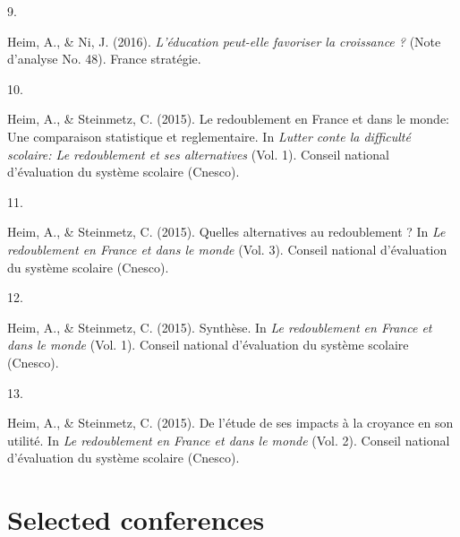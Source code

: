 \documentclass[11pt,a4paper,]{awesome-cv}
\newlength{\cslhangindent}
\newlength{\csllabelwidth}
\newenvironment{CSLReferences}[2] %
 {\begin{list}{}{%
  \setlength{\itemindent}{0pt}
  \setlength{\leftmargin}{0pt}
  \setlength{\parsep}{0pt}
  \ifodd #1
   \setlength{\leftmargin}{\cslhangindent}
   \setlength{\itemindent}{-1\cslhangindent}
  \fi
  \setlength{\itemsep}{#2\baselineskip}}}
 {\end{list}}
\newcommand{\CSLLeftMargin}[1]{\parbox[t]{\csllabelwidth}{\strut#1\strut}}
\newcommand{\CSLRightInline}[1]{\parbox[t]{\linewidth - \csllabelwidth}{\strut#1\strut}}
\begin{document}
\begin{CSLReferences}{0}{0}
\CSLLeftMargin{9. }%
\CSLRightInline{Heim, A., \& Ni, J. (2016). \emph{L'éducation peut-elle
favoriser la croissance ?} (Note d'analyse No. 48). France stratégie.}

\CSLLeftMargin{10. }%
\CSLRightInline{Heim, A., \& Steinmetz, C. (2015). Le redoublement en
France et dans le monde: Une comparaison statistique et reglementaire.
In \emph{Lutter conte la difficulté scolaire: Le redoublement et ses
alternatives} (Vol. 1). Conseil national d'évaluation du système
scolaire (Cnesco).}

\CSLLeftMargin{11. }%
\CSLRightInline{Heim, A., \& Steinmetz, C. (2015). Quelles alternatives
au redoublement ? In \emph{Le redoublement en France et dans le monde}
(Vol. 3). Conseil national d'évaluation du système scolaire (Cnesco).}

\CSLLeftMargin{12. }%
\CSLRightInline{Heim, A., \& Steinmetz, C. (2015). Synthèse. In \emph{Le
redoublement en France et dans le monde} (Vol. 1). Conseil national
d'évaluation du système scolaire (Cnesco).}

\CSLLeftMargin{13. }%
\CSLRightInline{Heim, A., \& Steinmetz, C. (2015). De l'étude de ses
impacts à la croyance en son utilité. In \emph{Le redoublement en France
et dans le monde} (Vol. 2). Conseil national d'évaluation du système
scolaire (Cnesco).}

\end{CSLReferences}

\section{Selected conferences}\label{selected-conferences}
\end{document}
